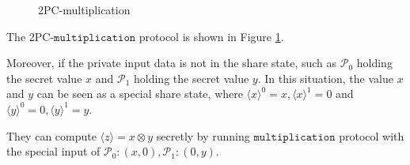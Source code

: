 \documentclass[letterpaper]{article} %
\begin{document}
\begin{figure}[ht]
{\begin{tabular}{lcl}
        \end{tabular}}
        \caption{2PC-multiplication}
        \label{2PC-multiplication}

    \end{figure}
    The 2PC-$\mathtt{multiplication}$ protocol is shown in Figure \ref{2PC-multiplication}.

    Moreover, if the private input data is not in the share state,
    such as $\mathcal{P}_{0}$ holding the secret value $x$
    and $\mathcal{P}_{1}$ holding the secret value $y$.
    In this situation, the value $x$ and $y$ can be
    seen as a special share state, where
    $\langle x\rangle ^{0}=x,\langle x\rangle ^{1}=0$ and
    $\langle y\rangle ^{0}=0,\langle y\rangle ^{1}=y$.

    They can compute $\langle z\rangle=x\otimes y$ secretly
    by running $\mathtt{multiplication}$ protocol with the special input of
    $\mathcal{P}_{0}:(x,0),\mathcal{P}_{1}:(0,y)$.
\end{document}
